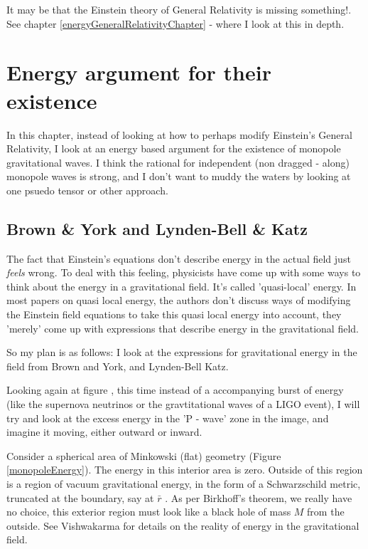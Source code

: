 \documentclass[../rzero]{subfiles}
\begin{document}
It may be that the Einstein theory of General Relativity is missing something!\cite{08092323EnergyMomentumGravitational}. See chapter \ref{energyGeneralRelativityChapter} - where I look at this in depth. 

\section{Energy argument for their existence}
In this chapter, instead of looking at how to perhaps modify Einstein's General Relativity, I look at an energy based argument for the existence of monopole gravitational waves. I think the rational for independent (non dragged - along) monopole waves is strong, and I don't want to muddy the waters by looking at one psuedo tensor or other approach.  

\subsection{Brown \& York and Lynden-Bell \& Katz}
The fact that Einstein's equations don't describe energy in the actual field just \textit{feels} wrong. To deal with this feeling, physicists have come up with some ways to think about the energy in a gravitational field. It's called 'quasi-local' energy. In most papers on quasi local energy, the authors don't discuss ways of modifying the Einstein field equations to take this quasi local energy into account, they 'merely' come up with expressions that describe energy in the gravitational field. 

So my plan is as follows: I look at the expressions for gravitational energy in the field from Brown and York\cite{Brown1993}, and Lynden-Bell Katz\cite{lyndenbell1985}. 

Looking again at figure \label{monopoleFigure}, this time instead of a accompanying burst of energy (like the supernova neutrinos or the gravtitational waves of a LIGO event), I will try and look at the excess energy in the 'P - wave' zone in the image, and imagine it moving, either outward or inward. 

Consider a spherical area of Minkowski (flat) geometry (Figure \ref{monopoleEnergy}). The energy in this interior area is zero. Outside of this region is a region of vacuum gravitational energy, in the form of a Schwarzschild metric, truncated at the boundary, say at $\bar r$ . As per Birkhoff's theorem, we really have no choice, this exterior region must look like a black hole of mass $M$ from the outside. See Vishwakarma\cite{vishwakarmaMysteriesRikNovel2014} for details on the reality of energy in the gravitational field. 
\end{document}
